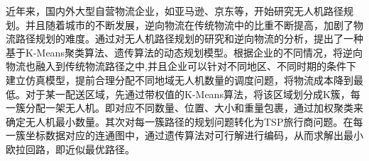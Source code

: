 \documentclass[twocolumn]{jbuaa}
\begin{document}
\begin{@twocolumnfalse}
			\begin{CAbstractJBUAA}
				近年来，国内外大型自营物流企业，如亚马逊、京东等，开始研究无人机路径规划。并且随着城市的不断发展，逆向物流在传统物流中的比重不断提高，加剧了物流路径规划的难度。通过对无人机路径规划的研究和逆向物流的分析，提出了一种基于K-Means聚类算法、遗传算法的动态规划模型。根据企业的不同情况，将逆向物流也融入到传统物流路径之中,并且企业可以针对不同地区、不同时期的条件下建立仿真模型，提前合理分配不同地域无人机数量的调度问题，将物流成本降到最低。对于某一配送区域，先通过带权值的K-Means算法，将该区域划分成K簇，每一簇分配一架无人机。即对应不同数量、位置、大小和重量包裹，通过加权聚类来确定无人机最小数量。其次对每一簇路径的规划问题转化为TSP旅行商问题。在每一簇坐标数据对应的连通图中，通过遗传算法对可行解进行编码，从而求解出最小欧拉回路，即近似最优路径。
			\end{CAbstractJBUAA}

			\positiontextbox{2.0cm}{27.4cm}{
				\noindent\rule{4cm}{.5pt}\\[0.5ex]%
				\hspace*{1em} \liuhao \linespread{0.8}\selectfont
				\parbox{\textwidth}{%
				}
			}


			\begin{flushleft}
				\parbox{\textwidth}{

					 \vspace{-2mm}%

}
\end{flushleft}
\end{@twocolumnfalse}
\end{document}
